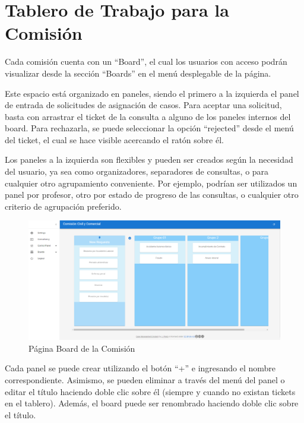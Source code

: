 \section{Tablero de Trabajo para la Comisión}
Cada comisión cuenta con un ``Board'', el cual los usuarios con acceso podrán visualizar desde la sección ``Boards'' en el menú desplegable de la página.

Este espacio está organizado en paneles, siendo el primero a la izquierda el panel de entrada de solicitudes de asignación de casos. Para aceptar una solicitud, basta con arrastrar el ticket de la consulta a alguno de los paneles internos del board. Para rechazarla, se puede seleccionar la opción ``rejected'' desde el menú del ticket, el cual se hace visible acercando el ratón sobre él.

Los paneles a la izquierda son flexibles y pueden ser creados según la necesidad del usuario, ya sea como organizadores, separadores de consultas, o para cualquier otro agrupamiento conveniente. Por ejemplo, podrían ser utilizados un panel por profesor, otro por estado de progreso de las consultas, o cualquier otro criterio de agrupación preferido.

\begin{figure}[H]
    \centering
    \includegraphics[width=1\linewidth]{fig/board-real-page.png}
    \caption{Página Board de la Comisión}
    \label{fig:board-real-page}
\end{figure}

Cada panel se puede crear utilizando el botón ``+'' e ingresando el nombre correspondiente. Asimismo, se pueden eliminar a través del menú del panel o editar el título haciendo doble clic sobre él (siempre y cuando no existan tickets en el tablero). Además, el board puede ser renombrado haciendo doble clic sobre el título.

